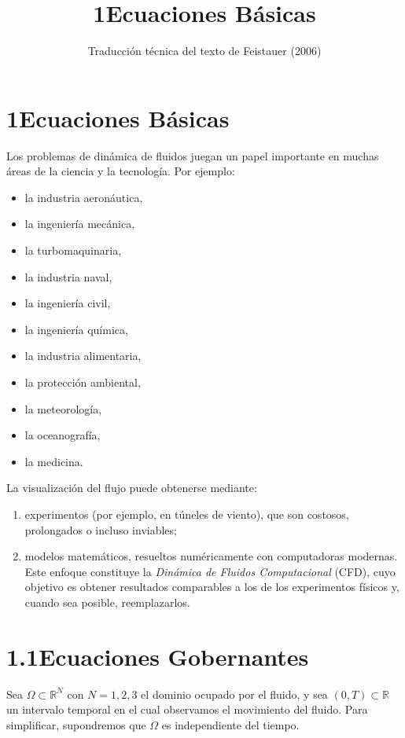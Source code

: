 \documentclass[12pt,a4paper]{article}
\title{1\quad Ecuaciones Básicas}
\author{Traducción técnica del texto de Feistauer (2006)}
\date{}
\begin{document}
\maketitle

\section*{1\quad Ecuaciones Básicas}

Los problemas de dinámica de fluidos juegan un papel importante en muchas áreas de la ciencia y la tecnología. Por ejemplo:
\begin{itemize}
  \item la industria aeronáutica,
  \item la ingeniería mecánica,
  \item la turbomaquinaria,
  \item la industria naval,
  \item la ingeniería civil,
  \item la ingeniería química,
  \item la industria alimentaria,
  \item la protección ambiental,
  \item la meteorología,
  \item la oceanografía,
  \item la medicina.
\end{itemize}

La visualización del flujo puede obtenerse mediante:
\begin{enumerate}
  \item experimentos (por ejemplo, en túneles de viento), que son costosos, prolongados o incluso inviables;
  \item modelos matemáticos, resueltos numéricamente con computadoras modernas. Este enfoque constituye la \textit{Dinámica de Fluidos Computacional} (CFD), cuyo objetivo es obtener resultados comparables a los de los experimentos físicos y, cuando sea posible, reemplazarlos.
\end{enumerate}

\section*{1.1\quad Ecuaciones Gobernantes}

Sea $\Omega \subset \mathbb{R}^N$ con $N=1,2,3$ el dominio ocupado por el fluido, y sea $\mbox{$(0,T) \subset \mathbb{R}$}$ un intervalo temporal en el cual observamos el movimiento del fluido. Para simplificar, supondremos que $\Omega$ es independiente del tiempo.
\end{document}
